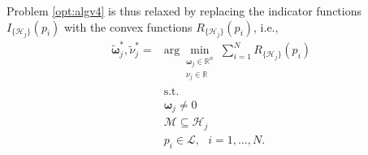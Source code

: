 \documentclass[twocolumn]{autart}
\newcommand{\tr}{\mbox{\tiny T}} %
\newcommand{\DP}[1]{{#1}}
\begin{document}
 Problem \eqref{opt:algv4} is thus relaxed \DP{by}  replacing the indicator functions $I_{\{\mathcal{H}_j\}}(p_i)$ with the convex functions $R_{\{\mathcal{H}_j\}}(p_i)$, i.e.,
  \begin{equation} \label{opt:algv4app}
  \begin{split}
\tilde{\boldsymbol{\omega}}^*_j,\tilde{\nu}^*_j= & \mbox{arg} \min_{\substack{     \boldsymbol{\omega}_j \in \mathbb{R}^n\\ \nu_j \in \mathbb{R} }}
\sum_{i=1}^N R_{\{\mathcal{H}_j\}}(p_i) \\
   & \mbox{s.t. } \\
   & \boldsymbol{\omega}_j \neq 0 \\
   & \mathcal{M} \subseteq \mathcal{H}_j \\
   & p_i \in \mathcal{L}, \ \ \ i=1,\ldots,N.
  \end{split}
  \end{equation}

\end{document}
